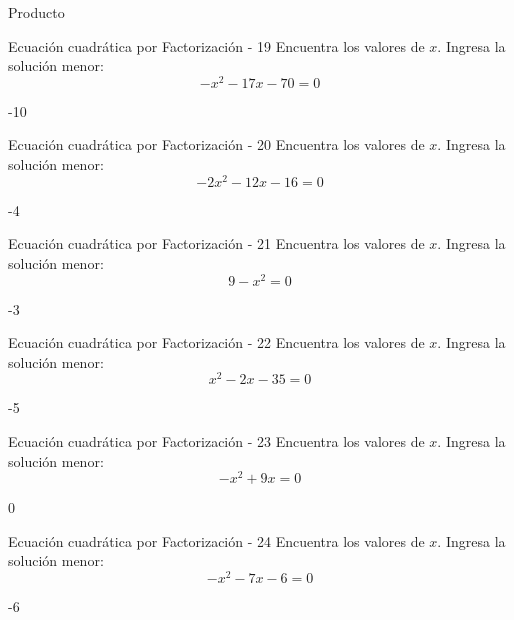 \documentclass[a4,11pt]{aleph-notas}
\begin{document}
\begin{quiz}{Producto}
\begin{numerical}[]%
    {Ecuación cuadrática por Factorización - 19}
    Encuentra los valores de $x$. Ingresa la solución menor:
    \[
        - x^{2} - 17 x - 70 = 0
    \]
    \item[] -10
\end{numerical}

\begin{numerical}[]%
    {Ecuación cuadrática por Factorización - 20}
    Encuentra los valores de $x$. Ingresa la solución menor:
    \[
        - 2 x^{2} - 12 x - 16 = 0
    \]
    \item[] -4
\end{numerical}

\begin{numerical}[]%
    {Ecuación cuadrática por Factorización - 21}
    Encuentra los valores de $x$. Ingresa la solución menor:
    \[
        9 - x^{2} = 0
    \]
    \item[] -3
\end{numerical}

\begin{numerical}[]%
    {Ecuación cuadrática por Factorización - 22}
    Encuentra los valores de $x$. Ingresa la solución menor:
    \[
        x^{2} - 2 x - 35 = 0
    \]
    \item[] -5
\end{numerical}

\begin{numerical}[]%
    {Ecuación cuadrática por Factorización - 23}
    Encuentra los valores de $x$. Ingresa la solución menor:
    \[
        - x^{2} + 9 x = 0
    \]
    \item[] 0
\end{numerical}

\begin{numerical}[]%
    {Ecuación cuadrática por Factorización - 24}
    Encuentra los valores de $x$. Ingresa la solución menor:
    \[
        - x^{2} - 7 x - 6 = 0
    \]
    \item[] -6
\end{numerical}


\end{quiz}
\end{document}
